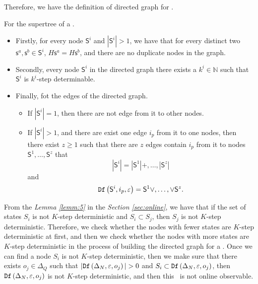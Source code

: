 Therefore, we have the definition of directed graph for \BCNs.
\begin{definition}
For the supertree of a \BCN.   
\begin{itemize}
\item Firstly, for every node $\mathsf{S}^i$ and $|\mathsf{S}^i|>1$, we have that for every distinct two $\mathsf{s}^a, \mathsf{s}^b \in \mathsf{S}^i$, $H\mathsf{s}^a=H\mathsf{s}^b$, and there are no duplicate nodes in the graph. 
\item Secondly, every node $\mathsf{S}^i$ in the directed graph there exists a $k^{i}\in \mathbb{N}$ such that $\mathsf{S}^i$ is $k^{i}$-step determinable. 

\item Finally, fot the edges of the directed graph. 
\begin{itemize}
 \item If $|\mathsf{S}^i|=1$, then there are not edge from it to other nodes.
 \item  If $|\mathsf{S}^i|>1$, and there are exist one edge $i_p$ from it to one nodes, then there exist $z\ge 1$ such that there are $z$ edges contain $i_p$ from it to nodes $\mathsf{S}^1,\ldots,\mathsf{S}^z$ that \[|\mathsf{S}^i|= |\mathsf{S}^1|+,\ldots,|\mathsf{S}^z|\] and \[{\tt Df}\left(\mathsf{S}^i,i_p,\varepsilon\right)=\mathsf{S}^1\vee,\ldots,\vee \mathsf{S}^z.\]
 \end{itemize}
 \end{itemize}
\end{definition}

From the {\em Lemma \ref{lemm:5}} in the {\em Section \ref{sec:online}}, we have that if the set of states $S_i$ is not $K$-step deterministic and $S_i\subset S_j$, then $S_j$ is not $K$-step deterministic. Therefore, we check whether the nodes with fewer states are $K$-step deterministic at first, and then we check whether the nodes with more states are $K$-step deterministic in the process of building the directed graph for a \BCN. Once we can find a node $S_i$ is not $K$-step deterministic, then we make sure that there exists $o_j \in \Delta_Q$ such that $|\Ded\left(\Delta_N,\varepsilon, o_j\right)|> 0$ and $S_i\subset {\tt Df}\left(\Delta_N,\varepsilon, o_j\right)$, then ${\tt Df}\left(\Delta_N,\varepsilon,o_j\right)$ is not $K$-step deterministic, and then this \BCN\ is not online observable. %

